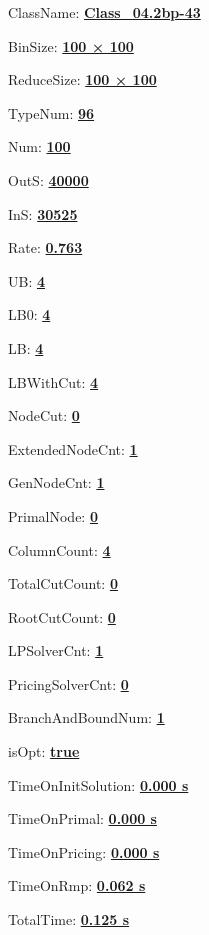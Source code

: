 \documentclass[11pt]{article}
\begin{document}
\pagestyle{empty}


ClassName: \underline{\textbf{Class_04.2bp-43}}
\par
BinSize: \underline{\textbf{100 × 100}}
\par
ReduceSize: \underline{\textbf{100 × 100}}
\par
TypeNum: \underline{\textbf{96}}
\par
Num: \underline{\textbf{100}}
\par
OutS: \underline{\textbf{40000}}
\par
InS: \underline{\textbf{30525}}
\par
Rate: \underline{\textbf{0.763}}
\par
UB: \underline{\textbf{4}}
\par
LB0: \underline{\textbf{4}}
\par
LB: \underline{\textbf{4}}
\par
LBWithCut: \underline{\textbf{4}}
\par
NodeCut: \underline{\textbf{0}}
\par
ExtendedNodeCnt: \underline{\textbf{1}}
\par
GenNodeCnt: \underline{\textbf{1}}
\par
PrimalNode: \underline{\textbf{0}}
\par
ColumnCount: \underline{\textbf{4}}
\par
TotalCutCount: \underline{\textbf{0}}
\par
RootCutCount: \underline{\textbf{0}}
\par
LPSolverCnt: \underline{\textbf{1}}
\par
PricingSolverCnt: \underline{\textbf{0}}
\par
BranchAndBoundNum: \underline{\textbf{1}}
\par
isOpt: \underline{\textbf{true}}
\par
TimeOnInitSolution: \underline{\textbf{0.000 s}}
\par
TimeOnPrimal: \underline{\textbf{0.000 s}}
\par
TimeOnPricing: \underline{\textbf{0.000 s}}
\par
TimeOnRmp: \underline{\textbf{0.062 s}}
\par
TotalTime: \underline{\textbf{0.125 s}}
\par
\newpage
\end{document}
